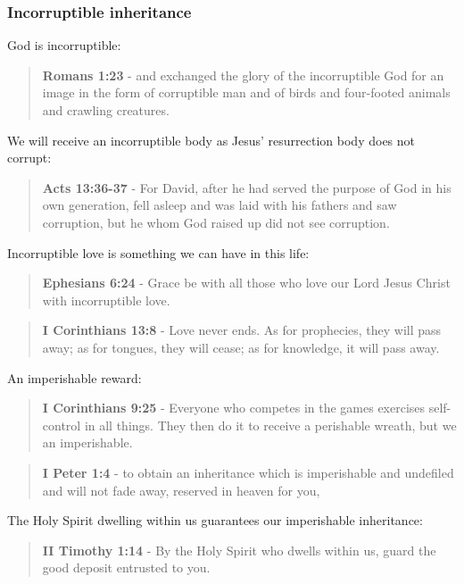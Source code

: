 \documentclass[11pt]{article}
\begin{document}
\subsubsection{Incorruptible inheritance}
\label{sec:org6718d67}
God is incorruptible:

\begin{quote}
\textbf{Romans 1:23} - and exchanged the glory of the incorruptible God for an image in the form of corruptible man and of birds and four-footed animals and crawling creatures.
\end{quote}

We will receive an incorruptible body as Jesus' resurrection body does not corrupt:

\begin{quote}
\textbf{Acts 13:36-37} - For David, after he had served the purpose of God in his own generation, fell asleep and was laid with his fathers and saw corruption, but he whom God raised up did not see corruption.
\end{quote}

Incorruptible love is something we can have in this life:

\begin{quote}
\textbf{Ephesians 6:24} - Grace be with all those who love our Lord Jesus Christ with incorruptible love.
\end{quote}

\begin{quote}
\textbf{I Corinthians 13:8} - Love never ends. As for prophecies, they will pass away; as for tongues, they will cease; as for knowledge, it will pass away.
\end{quote}

An imperishable reward:

\begin{quote}
\textbf{I Corinthians 9:25} - Everyone who competes in the games exercises self-control in all things. They then do it to receive a perishable wreath, but we an imperishable.
\end{quote}

\begin{quote}
\textbf{I Peter 1:4} - to obtain an inheritance which is imperishable and undefiled and will not fade away, reserved in heaven for you,
\end{quote}

The Holy Spirit dwelling within us guarantees our imperishable inheritance:

\begin{quote}
\textbf{II Timothy 1:14} - By the Holy Spirit who dwells within us, guard the good deposit entrusted to you.
\end{quote}
\end{document}

